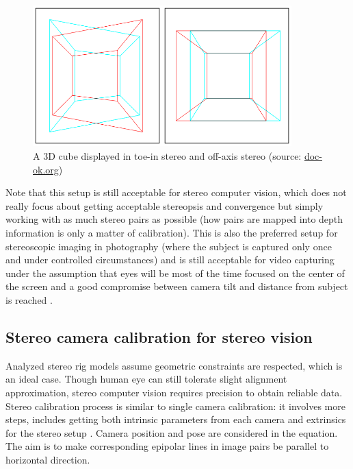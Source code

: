 \begin{figure}
\centering
\includegraphics[width=10cm]{pictures/keystoning}
\caption{A 3D cube displayed in toe-in stereo and off-axis stereo (source: \href{http://doc-ok.org/?p=77} {doc-ok.org})}
\label{fig:keystoning}
\end{figure}

Note that this setup is still acceptable for stereo computer vision, which does not really focus about getting acceptable stereopsis and convergence but simply working with as much stereo pairs as possible \cite{book_cv} (how pairs are mapped into depth information is only a matter of calibration). This is also the preferred setup for stereoscopic imaging in photography (where the subject is captured only once and under controlled circumstances) and is still acceptable for video capturing under the assumption that eyes will be most of the time focused on the center of the screen and a good compromise between camera tilt and distance from subject is reached \cite{link_stereo_tricks}.

\subsection{Stereo camera calibration for stereo vision}
Analyzed stereo rig models assume geometric constraints are respected, which is an ideal case. Though human eye can still tolerate slight alignment approximation, stereo computer vision requires precision to obtain reliable data. Stereo calibration process is similar to single camera calibration: it involves more steps, includes getting both intrinsic parameters from each camera and extrinsics for the stereo setup \cite{link_stereo_calib_example}. Camera position and pose are considered in the equation. The aim is to make corresponding epipolar lines in image pairs be parallel to horizontal direction.

